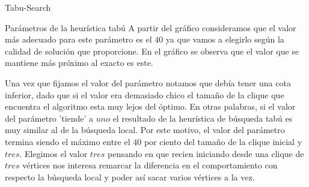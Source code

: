 \begin{section}{Tabu-Search}
\begin{subsection}{Parámetros de la heurística tabú}
	A partir del gráfico consideramos que el valor más adecuado para este parámetro es el $40$ ya que vamos a elegirlo según la calidad de solución que proporcione. En el gráfico se observa que el valor que se mantiene más próximo al exacto es este.

	Una vez que fijamos el valor del parámetro notamos que debía tener una cota inferior, dado que si el valor era demasiado chico el tamaño de la clique que encuentra el algoritmo esta muy lejos del óptimo. En otras palabras, si el valor del parámetro 'tiende' a $uno$ el resultado de la heurística de búsqueda tabú es muy similar al de la búsqueda local. Por este motivo, el valor del parámetro termina siendo el máximo entre el $40$ por ciento del tamaño de la clique inicial y $tres$. Elegimos el valor $tres$ pensando en que recien iniciando desde una clique de $tres$ vértices nos interesa remarcar la diferencia en el comportamiento con respecto la búsqueda local y poder así sacar varios vértices a la vez.
	\end{subsection}
\end{section}
